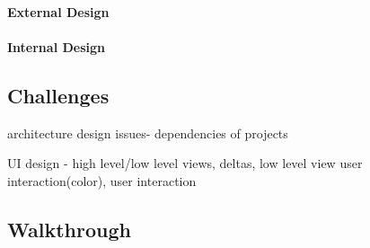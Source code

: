 \paragraph{External Design}
\paragraph{Internal Design}

\subsection{Challenges}\label{subsec:designchallenges}
architecture design issues- dependencies of projects 

UI design - high level/low level views, deltas, low level view user interaction(color), user interaction

\subsection{Walkthrough}\label{subsec:walkthrough}







